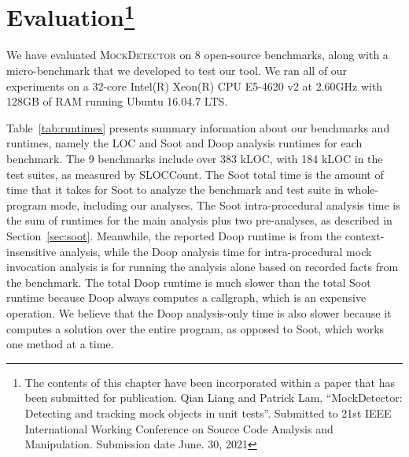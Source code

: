 \chapter[Evaluation]{Evaluation\footnote{The contents of this 
		chapter have been incorporated within a paper that has been submitted for publication. Qian Liang and Patrick Lam, “MockDetector: Detecting and tracking mock objects in unit tests”. Submitted to 21st IEEE International Working Conference on Source Code Analysis and Manipulation. Submission date June. 30, 2021}}
\label{chap:evaluation}	

We have evaluated \textsc{MockDetector} on 8 open-source benchmarks, along with a micro-benchmark that we developed to test our tool. We ran all of our experiments on a 32-core Intel(R) Xeon(R) CPU E5-4620 v2 at 2.60GHz with 128GB of RAM running Ubuntu 16.04.7 LTS.

Table~\ref{tab:runtimes} presents summary information about our benchmarks and runtimes, namely the LOC and Soot and Doop analysis runtimes for each benchmark. The 9 benchmarks include over 383 kLOC, with 184 kLOC in the test suites, as measured by SLOCCount. The Soot total time is the amount of time that it takes for Soot to analyze the benchmark and test suite in whole-program mode, including our analyses. The Soot intra-procedural analysis time is the sum of runtimes for the main analysis plus two pre-analyses, as described in Section~\ref{sec:soot}. Meanwhile, the reported Doop runtime is from the context-insensitive analysis, while the Doop analysis time for intra-procedural mock invocation analysis is for running the analysis alone based on recorded facts from the benchmark. The total Doop runtime is much slower than the total Soot runtime because Doop always computes a callgraph, which is an expensive operation. We believe that the Doop analysis-only time is also slower because it computes a solution over the entire program, as opposed to Soot, which works one method at a time.

